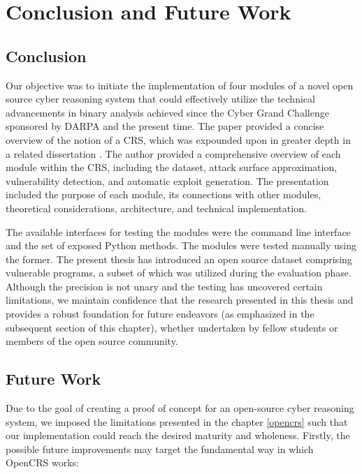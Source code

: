 \documentclass[../main.tex]{subfiles}
\begin{document}
\hypertarget{conclusion}{%
  \chapter{Conclusion and Future Work}\label{conclusion_future}}

\hypertarget{conclusion}{%
  \section{Conclusion}\label{conclusion}}

Our objective was to initiate the implementation of four modules of a novel
open source cyber reasoning system that could effectively utilize the technical
advancements in binary analysis achieved since the Cyber Grand Challenge
sponsored by DARPA and the present time. The paper provided a concise overview
of the notion of a CRS, which was expounded upon in greater depth in a related
dissertation \cite{ghenea}. The author provided a comprehensive overview of
each module within the CRS, including the dataset, attack surface
approximation, vulnerability detection, and automatic exploit generation. The
presentation included the purpose of each module, its connections with other
modules, theoretical considerations, architecture, and technical
implementation.

The available interfaces for testing the modules were the command line
interface and the set of exposed Python methods. The modules were tested
manually using the former. The present thesis has introduced an open source
dataset comprising vulnerable programs, a subset of which was utilized during
the evaluation phase. Although the precision is not unary and the testing has
uncovered certain limitations, we maintain confidence that the research
presented in this thesis and \cite{ghenea} provides a robust foundation for
future endeavors (as emphasized in the subsequent section of this chapter),
whether undertaken by fellow students or members of the open source community.

\hypertarget{future-work}{%
  \section{Future Work}\label{future-work}}

Due to the goal of creating a proof of concept for an open-source cyber
reasoning system, we imposed the limitations presented in the chapter
\ref{opencrs} such that our implementation could reach the desired maturity and
wholeness. Firstly, the possible future improvements may target the fundamental
way in which OpenCRS works:
\end{document}
